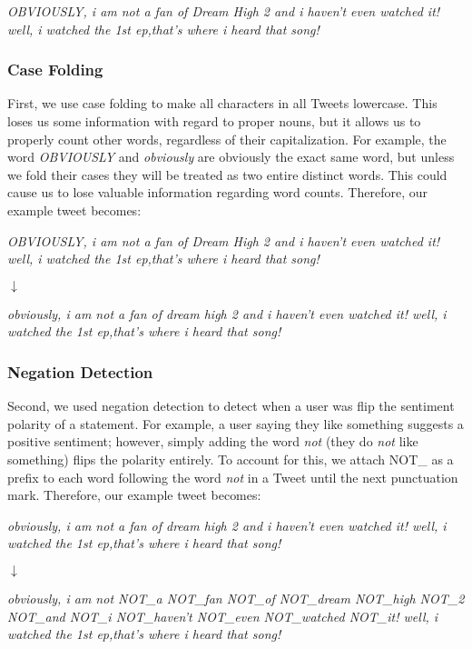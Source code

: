 \documentclass[11pt,letterpaper]{article}
\begin{document}
\begin{center}
\textit{OBVIOUSLY, i am not a fan of Dream High 2 and i haven't even watched it! well, i watched the 1st ep,that's where i heard that song!}
\end{center}

\subsubsection{Case Folding}
First, we use case folding to make all characters in all Tweets lowercase. This loses us some information with regard to proper nouns, but it allows us to properly count other words, regardless of their capitalization. For example, the word \emph{OBVIOUSLY} and \emph{obviously} are obviously the exact same word, but unless we fold their cases they will be treated as two entire distinct words. This could cause us to lose valuable information regarding word counts. Therefore, our example tweet becomes: 
\begin{center}
\textit{OBVIOUSLY, i am not a fan of Dream High 2 and i haven't even watched it! well, i watched the 1st ep,that's where i heard that song!}

\(\downarrow\)

\textit{obviously, i am not a fan of dream high 2 and i haven't even watched it! well, i watched the 1st ep,that's where i heard that song!}
\end{center}

\subsubsection{Negation Detection}
Second, we used negation detection to detect when a user was flip the sentiment polarity of a statement. For example, a user saying they like something suggests a positive sentiment; however, simply adding the word \emph{not} (they do \emph{not} like something) flips the polarity entirely. To account for this, we attach NOT\_ as a prefix to each word following the word \emph{not} in a Tweet until the next punctuation mark. Therefore, our example tweet becomes:

\begin{center}
\textit{obviously, i am not a fan of dream high 2 and i haven't even watched it! well, i watched the 1st ep,that's where i heard that song!}

\(\downarrow\)

\textit{obviously, i am not NOT\_a NOT\_fan NOT\_of NOT\_dream NOT\_high NOT\_2 NOT\_and NOT\_i NOT\_haven't NOT\_even NOT\_watched NOT\_it! well, i watched the 1st ep,that's where i heard that song!}
\end{center}
\end{document}
